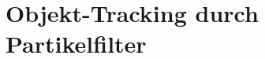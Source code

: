 \section{Objekt-Tracking durch Partikelfilter}%
\label{track:sec:objekt_tracking_durch_partikelfilter}
